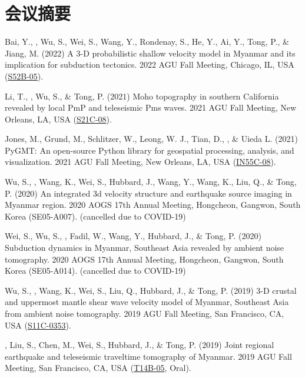 \section{会议摘要}

\begin{etaremune}
\item
    Bai, Y., \Yao, Wu, S., Wei, S., Wang, Y., Rondenay, S., He, Y., Ai, Y., Tong, P., \& Jiang, M. (2022)
    A 3-D probabilistic shallow velocity model in Myanmar and its implication for subduction tectonics.
    2022 AGU Fall Meeting, Chicago, IL, USA (\href{https://agu.confex.com/agu/fm22/meetingapp.cgi/Paper/1195428}{S52B-05}).
\item
    Li, T., \Yao, Wu, S., \& Tong, P. (2021)
    Moho topography in southern California revealed by local PmP and teleseismic Pms waves.
    2021 AGU Fall Meeting, New Orleans, LA, USA (\href{https://ui.adsabs.harvard.edu/abs/2021AGUFM.S21C..08L}{S21C-08}).
\item
    Jones, M., Grund, M., Schlitzer, W., Leong, W. J., Tian, D., \Yao, \& Uieda L. (2021)
    PyGMT: An open-source Python library for geospatial processing, analysis, and visualization.
    2021 AGU Fall Meeting, New Orleans, LA, USA (\href{http://adsabs.harvard.edu/abs/2017AGUFM.S43H2967Y}{IN55C-08}).
\item
    Wu, S., \Yao, Wang, K., Wei, S., Hubbard, J., Wang, Y., Wang, K., Liu, Q., \& Tong, P. (2020)
    An integrated 3d velocity structure and earthquake source imaging in Myanmar region.
    2020 AOGS 17th Annual Meeting, Hongcheon, Gangwon, South Korea (SE05-A007). (cancelled due to COVID-19)
\item
    Wei, S., Wu, S., \Yao, Fadil, W., Wang, Y., Hubbard, J., \& Tong, P. (2020)
    Subduction dynamics in Myanmar, Southeast Asia revealed by ambient noise tomography.
    2020 AOGS 17th Annual Meeting, Hongcheon, Gangwon, South Korea (SE05-A014). (cancelled due to COVID-19)
\item
    Wu, S., \Yao, Wang, K., Wei, S., Liu, Q., Hubbard, J., \& Tong, P. (2019)
    3-D crustal and uppermost mantle shear wave velocity model of Myanmar, Southeast Asia from ambient noise tomography.
    2019 AGU Fall Meeting, San Francisco, CA, USA (\href{https://adsabs.harvard.edu/abs/2019AGUFM.S11C0353W}{S11C-0353}).
\item
    \Yao, Liu, S., Chen, M., Wei, S., Hubbard, J., \& Tong, P. (2019)
    Joint regional earthquake and teleseismic traveltime tomography of Myanmar.
    2019 AGU Fall Meeting, San Francisco, CA, USA (\href{http://adsabs.harvard.edu/abs/2019AGUFM.T14B..05Y}{T14B-05}, Oral).

\end{etaremune}

